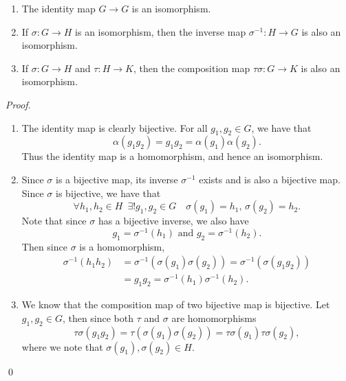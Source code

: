 \documentclass[notoc,notitlepage]{tufte-book}
\begin{document}
\begin{propo}
\label{propo:isomorphism_as_an_equivalence_relation}
  \begin{enumerate}
    \item {} The identity map $G \to G$ is an isomorphism.
    \item {} If $\sigma : G \to H$ is an isomorphism, then the inverse map $\sigma^{-1} : H \to G$ is also an isomorphism.
    \item {} If $\sigma : G \to H$ and $\tau : H \to K$, then the composition map $\tau \sigma : G \to K$ is also an isomorphism.
  \end{enumerate}
\end{propo}

\begin{proof}
  \begin{enumerate}
    \item The identity map is clearly bijective. For all $g_1, g_2 \in G$, we have that
      \begin{equation*}
        \alpha(g_1 g_2) = g_1 g_2 = \alpha(g_1)\alpha(g_2).
      \end{equation*}
      Thus the identity map is a homomorphism, and hence an isomorphism.
    
    \item Since $\sigma$ is a bijective map, its inverse $\sigma^{-1}$ exists and is also a bijective map. Since $\sigma$ is bijective, we have that
      \begin{equation*}
        \forall h_1, h_2 \in H \enspace \exists ! g_1, g_2 \in G \quad \sigma(g_1) = h_1, \, \sigma(g_2) = h_2.
      \end{equation*}
      Note that since $\sigma$ has a bijective inverse, we also have
      \begin{equation*}
        g_1 = \sigma^{-1}(h_1) \text{ and } g_2 = \sigma^{-1}(h_2).
      \end{equation*}
      Then since $\sigma$ is a homomorphism,
      \begin{align*}
        \sigma^{-1}(h_1 h_2) &= \sigma^{-1}(\sigma(g_1)\sigma(g_2)) = \sigma^{-1}(\sigma(g_1 g_2)) \\
          &= g_1 g_2 = \sigma^{-1}(h_1) \sigma^{-1}(h_2).
      \end{align*}

    \item We know that the composition map of two bijective map is bijective. Let $g_1, g_2 \in G$, then since both $\tau$ and $\sigma$ are homomorphisms
      \begin{equation*}
        \tau \sigma (g_1 g_2) = \tau( \sigma(g_1) \sigma(g_2) ) = \tau \sigma(g_1) \tau \sigma(g_2),
      \end{equation*}
      where we note that $\sigma(g_1), \sigma(g_2) \in H$.
\end{enumerate}\qed
\end{proof}
\end{document}
